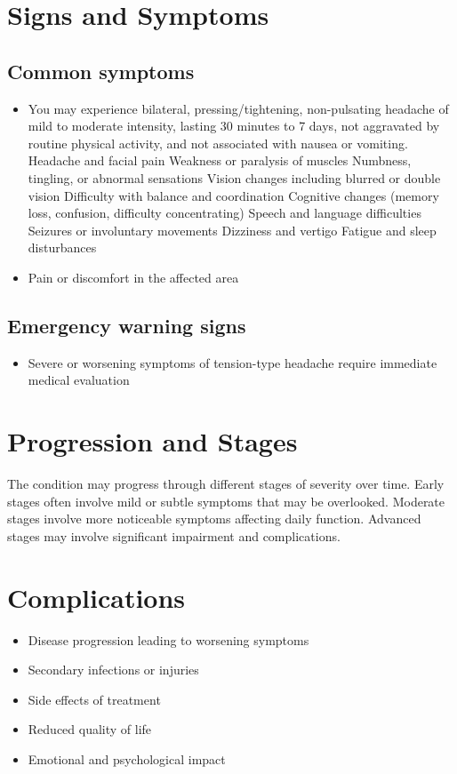 \section{Signs and Symptoms}
\subsection{Common symptoms}
\begin{itemize}[noitemsep]
  \item You may experience bilateral, pressing/tightening, non-pulsating headache of mild to moderate intensity, lasting 30 minutes to 7 days, not aggravated by routine physical activity, and not associated with nausea or vomiting. Headache and facial pain Weakness or paralysis of muscles Numbness, tingling, or abnormal sensations Vision changes including blurred or double vision Difficulty with balance and coordination Cognitive changes (memory loss, confusion, difficulty concentrating) Speech and language difficulties Seizures or involuntary movements Dizziness and vertigo Fatigue and sleep disturbances
  \item Pain or discomfort in the affected area
  \end{itemize}
\subsection{Emergency warning signs}
\begin{itemize}[noitemsep]
  \item Severe or worsening symptoms of tension-type headache require immediate medical evaluation
\end{itemize}
\section{Progression and Stages}
The condition may progress through different stages of severity over time. Early stages often involve mild or subtle symptoms that may be overlooked. Moderate stages involve more noticeable symptoms affecting daily function. Advanced stages may involve significant impairment and complications.
\section{Complications}
\begin{itemize}[noitemsep]
  \item Disease progression leading to worsening symptoms
  \item Secondary infections or injuries
  \item Side effects of treatment
  \item Reduced quality of life
  \item Emotional and psychological impact
\end{itemize}
